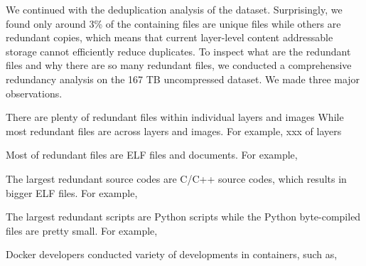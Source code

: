 
We continued with the deduplication analysis of the dataset.
%
Surprisingly, we found only around 3\% of the containing files are unique files
while others are redundant copies, which means that current layer-level content
addressable storage cannot efficiently reduce duplicates.
%
To inspect what are the redundant files and why there are so many redundant
files, we conducted a comprehensive redundancy analysis on the 167 TB
uncompressed dataset.
%
We made three major observations.
%
\begin{compactitemize}
%
\item There are plenty of redundant files within individual layers and images
While most redundant files are across layers and images.
%
For example, xxx of layers
%
\item Most of redundant files are ELF files and documents.
%
For example,
%
\item The largest redundant source codes are C/C++ source codes, which results
in bigger ELF files.
%
For example,
%
\item The largest redundant scripts are Python scripts while the Python
byte-compiled files are pretty small.
%
For example,
%
\item Docker developers conducted variety of developments in containers, such
as,
%
\end{compactitemize}


